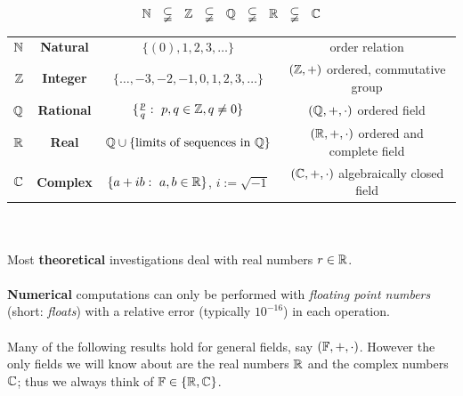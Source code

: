 \begin{frame}
$${\mathbb{N}} ~~\subsetneqq~~ {\mathbb{Z}}~~  \subsetneqq~~   {\mathbb{Q}} ~~ \subsetneqq ~~  {\mathbb{R}}~~  \subsetneqq~~  {\mathbb{C}} $$ 
\begin{table}
	\centering
	\begin{tabular}{c|c|c|c}
		${\mathbb{N}}$ & \textbf{Natural} 	& $\{(0),1,2,3, \ldots\}$ & order relation\\[0.2cm]
		${\mathbb{Z}}$ & \textbf{Integer} 	& $\{ \ldots,-3,-2,-1,0,1,2,3, \ldots\}$ & $({\mathbb{Z}}, +)$ ordered, commutative group\\[0.2cm]
		${\mathbb{Q}}$ & \textbf{Rational} & $\{\frac{p}{q}: ~p,q\in {\mathbb{Z}}, q \neq 0\}$& $({\mathbb{Q}}, +, \cdot)$ ordered field\\[0.2cm]
		${\mathbb{R}}$ & \textbf{Real} 	& $ {\mathbb{Q}} \cup \{\text{limits of sequences in } {\mathbb{Q}}\}$ & $({\mathbb{R}}, +, \cdot)$ ordered and complete field \\[0.2cm]
		${\mathbb{C}}$ & \textbf{Complex}  & $\{a+ib:~a,b\in {\mathbb{R}}\}$, $i:= \sqrt{-1}$  & $({\mathbb{C}}, +, \cdot)$ algebraically closed field
	\end{tabular}
	\label{tab:numbers}
\end{table}
~\\~\\
Most \textbf{theoretical} investigations deal with real numbers $r\in{\mathbb{R}}$.
 ~\\~\\
\textbf{Numerical} computations can only be performed with \textit{floating point numbers} (short: \textit{floats}) with a relative error (typically $10^{-16}$) in each operation.
~\\~\\
Many of the following results hold for general fields, say $({\mathbb{F}}, +, \cdot)$. However the only fields we will know about are the real numbers ${\mathbb{R}}$ and the complex numbers ${\mathbb{C}}$; thus we always think of ${\mathbb{F}} \in \{{\mathbb{R}},{\mathbb{C}}\}$.
\end{frame}



